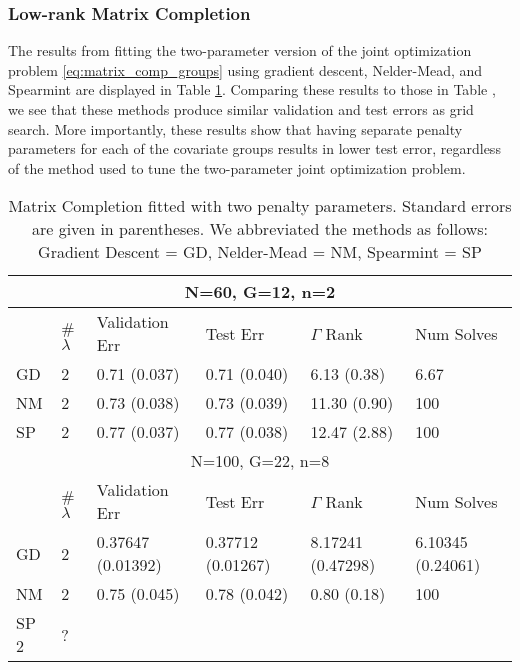 \documentclass[12pt,letterpaper]{article}
\begin{document}
\subsubsection{Low-rank Matrix Completion}
The results from fitting the two-parameter version of the joint optimization problem \eqref{eq:matrix_comp_groups} using gradient descent, Nelder-Mead, and Spearmint are displayed in Table \ref{table:two_param_matrix_completion}. Comparing these results to those in Table \label{table:matrix_completion}, we see that these methods produce similar validation and test errors as grid search. More importantly, these results show that having separate penalty parameters for each of the covariate groups results in lower test error, regardless of the method used to tune the two-parameter joint optimization problem.

\begin{table}
	\caption{\label{table:two_param_matrix_completion} Matrix Completion fitted with two penalty parameters. Standard errors are given in parentheses. We abbreviated the methods as follows: Gradient Descent = GD, Nelder-Mead = NM, Spearmint = SP}
	\centering
	\begin{tabular}{| l | l | l | l | l | l |}
		\hline
		\multicolumn{6}{|c|}{N=60, G=12, n=2}\\
		\hline
		& \# $\lambda$ & Validation Err & Test Err& $\Gamma$ Rank & Num Solves\\
		\hline
		GD & 2 & 0.71 (0.037) &  0.71 (0.040) & 6.13 (0.38) & 6.67 \\
		\hline
		NM & 2 & 0.73 (0.038) & 0.73 (0.039) & 11.30 (0.90) & 100 \\
		\hline
		SP & 2 & 0.77 (0.037) & 0.77 (0.038) & 12.47 (2.88) & 100\\
		\hline
		\multicolumn{6}{|c|}{N=100, G=22, n=8}\\
		\hline
		& \# $\lambda$ & Validation Err & Test Err&  $\Gamma$ Rank & Num Solves\\
		\hline
		GD & 2 & 0.37647 (0.01392) & 0.37712 (0.01267) & 8.17241 (0.47298) & 6.10345 (0.24061)\\
		\hline
		NM & 2 & 0.75 (0.045) & 0.78 (0.042) & 0.80 (0.18) & 100\\
		\hline
		SP 2 & ?\\
		\hline
	\end{tabular}
\end{table}



\end{document}

